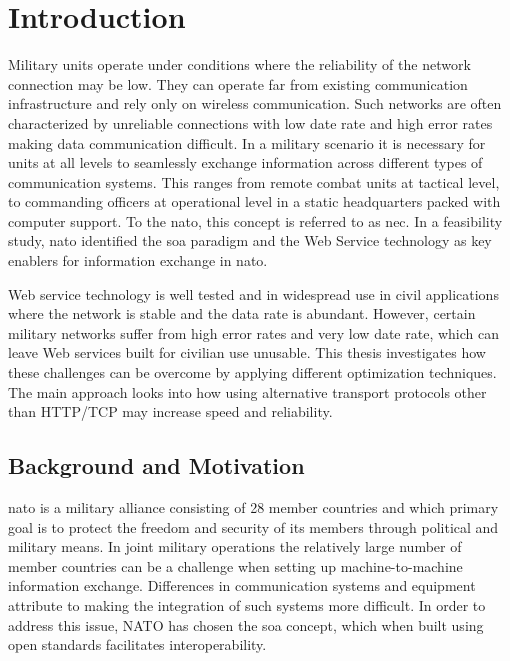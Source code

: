 \chapter{Introduction}

Military units operate under conditions where the reliability of the network
connection may be low. They can operate far from existing communication
infrastructure and rely only on wireless communication. Such networks are often
characterized by unreliable connections with low date rate and high error rates
making data communication difficult. In a military scenario it is necessary for
units at all levels to seamlessly exchange information across different types of
communication systems. This ranges from remote combat units at tactical level,
to commanding officers at operational level in a static headquarters packed with
computer support. To the \gls{nato}, this concept is referred to as \gls{nec}.
In a feasibility study, \gls{nato} identified the \gls{soa} paradigm and the Web
Service technology as key enablers for information exchange in
\gls{nato}\cite{nnec-study}.

Web service technology is well tested and in widespread use in civil
applications where the network is stable and the data rate is abundant. However,
certain military networks suffer from high error rates and very low date rate,
which can leave Web services built for civilian use unusable. This thesis
investigates how these challenges can be overcome by applying  different
optimization techniques. The main approach looks into how using alternative
transport protocols other than HTTP/TCP may increase speed and reliability.


\section{Background and Motivation}

\gls{nato} is a military alliance consisting of 28 member countries
\cite{nato-homepage-member-countries} and which primary goal is to protect the
freedom and security of its members through political and military means. In
joint military operations the relatively large number of member countries can be
a challenge when setting up machine-to-machine information exchange. Differences
in communication systems and equipment attribute to making the integration of
such systems more difficult. In order to address this issue, NATO has chosen the
\gls{soa} concept, which when built using open standards facilitates
interoperability\cite{nnec-study}.

